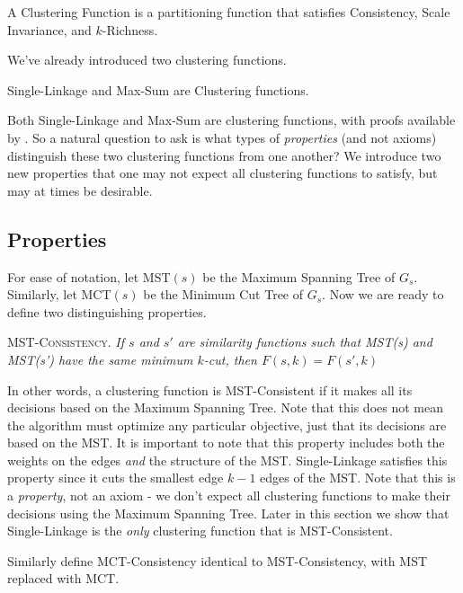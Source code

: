 \documentclass[twoside,11pt]{article}
\begin{document}
\begin{definition}
A Clustering Function is a partitioning function that satisfies Consistency, Scale Invariance, and $k$-Richness.
\end{definition}

We've already introduced two clustering functions.

\begin{theorem}
Single-Linkage and Max-Sum are Clustering functions.
\end{theorem}

Both Single-Linkage and Max-Sum are clustering functions, with proofs available by \cite{bosagh2009}. So a natural question to ask is what types of \textit{properties} (and not axioms) distinguish these two clustering functions from one another? We introduce two new properties that one may not expect all clustering functions to satisfy, but may at times be desirable.

\subsection{Properties}

For ease of notation, let MST$(s)$ be the Maximum Spanning Tree of $G_s$. Similarly, let MCT$(s)$ be the Minimum Cut Tree of $G_s$. Now we are ready to define two distinguishing properties.

\begin{center}
\textsc{MST-Consistency.} \textit{If $s$ and $s'$ are similarity functions such that MST(s) and MST(s') have the same minimum $k$-cut, then $F(s,k) = F(s',k)$}
\end{center}

In other words, a clustering function is MST-Consistent if it makes all its decisions based on the Maximum Spanning Tree. Note that this does not mean the algorithm must optimize any particular objective, just that its decisions are based on the MST. It is important to note that this property includes both the weights on the edges \textit{and} the structure of the MST. Single-Linkage satisfies this property since it cuts the smallest edge $k-1$ edges of the MST. Note that this is a \textit{property}, not an axiom - we don't expect all clustering functions to make their decisions using the Maximum Spanning Tree. Later in this section we show that Single-Linkage is the \textit{only} clustering function that is MST-Consistent.

Similarly define MCT-Consistency identical to MST-Consistency, with MST replaced with MCT.
\end{document}
